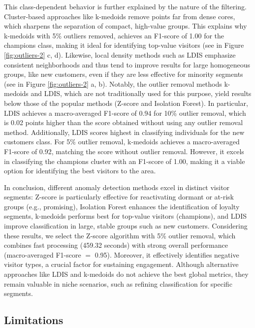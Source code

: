\documentclass{ws-ijitdm}
\begin{document}
{\color{black}This class-dependent behavior is further explained by the nature of the filtering. Cluster-based approaches like k-medoids remove points far from dense cores, which sharpens the separation of compact, high-value groups. This explains why k-medoids with 5\% outliers removed, achieves an F1-score of 1.00 for the champions class, making it ideal for identifying top-value visitors\cite{He2003CBLOF} (see in Figure \ref{fig:outliers-2} c, d). Likewise, local density methods such as LDIS emphasize consistent neighborhoods and thus tend to improve results for large homogeneous groups, like new customers, even if they are less effective for minority segments\cite{Zhang2009LDOF} (see in Figure \ref{fig:outliers-2} a, b).} Notably, the outlier removal methods k-medoids and LDIS, which are not traditionally used for this purpose, yield results below those of the popular methods (Z-score and Isolation Forest). In particular, LDIS achieves a macro-averaged F1-score of 0.94 for 10\% outlier removal, which is 0.02 points higher than the score obtained without using any outlier removal method. Additionally, LDIS scores highest in classifying individuals for the new customers class. For 5\% outlier removal, k-medoids achieves a macro-averaged F1-score of 0.92, matching the score without outlier removal. However, it excels in classifying the champions cluster with an F1-score of 1.00, making it a viable option for identifying the best visitors to the area.

{\color{black}In conclusion, different anomaly detection methods excel in distinct visitor segments: Z-score is particularly effective for reactivating dormant or at-risk groups (e.g., promising), Isolation Forest enhances the identification of loyalty segments, k-medoids performs best for top-value visitors (champions), and LDIS improve classification in large, stable groups such as new customers. Considering these results,} we select the Z-score algorithm with 5\% outlier removal, which combines fast processing (459.32 seconds) with strong overall performance (macro-averaged F1-score $=$ 0.95). Moreover, it effectively identifies negative visitor types, a crucial factor for sustaining engagement. Although alternative approaches like LDIS and k-medoids do not achieve the best global metrics, they remain valuable in niche scenarios, such as refining classification for specific segments.

{\color{black}\subsection{Limitations}} \label{subsec:limitations}
\end{document}
